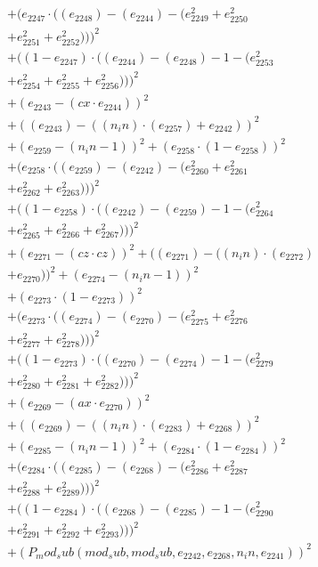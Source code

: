 \documentclass[10pt, a4paper]{article}
\begin{document}
\begin{align*}
& + (e_{2247}  \cdot  ((e_{2248}) - (e_{2244}) - (e_{2249}^{2} + e_{2250}^{2} \\
& + e_{2251}^{2} + e_{2252}^{2})))^{2} \\
& + ((1 - e_{2247})  \cdot  ((e_{2244}) - (e_{2248}) - 1 - (e_{2253}^{2} \\
& + e_{2254}^{2} + e_{2255}^{2} + e_{2256}^{2})))^{2} \\
& + (e_{2243} - (cx  \cdot  e_{2244}))^{2} \\
& + ((e_{2243}) - ((n_in)  \cdot  (e_{2257}) + e_{2242}))^{2} \\
& + (e_{2259} - (n_in - 1))^{2} + (e_{2258}  \cdot  (1 - e_{2258}))^{2} \\
& + (e_{2258}  \cdot  ((e_{2259}) - (e_{2242}) - (e_{2260}^{2} + e_{2261}^{2} \\
& + e_{2262}^{2} + e_{2263}^{2})))^{2} \\
& + ((1 - e_{2258})  \cdot  ((e_{2242}) - (e_{2259}) - 1 - (e_{2264}^{2} \\
& + e_{2265}^{2} + e_{2266}^{2} + e_{2267}^{2})))^{2} \\
& + (e_{2271} - (cz  \cdot  cz))^{2} + ((e_{2271}) - ((n_in)  \cdot  (e_{2272}) \\
& + e_{2270}))^{2} + (e_{2274} - (n_in - 1))^{2} \\
& + (e_{2273}  \cdot  (1 - e_{2273}))^{2} \\
& + (e_{2273}  \cdot  ((e_{2274}) - (e_{2270}) - (e_{2275}^{2} + e_{2276}^{2} \\
& + e_{2277}^{2} + e_{2278}^{2})))^{2} \\
& + ((1 - e_{2273})  \cdot  ((e_{2270}) - (e_{2274}) - 1 - (e_{2279}^{2} \\
& + e_{2280}^{2} + e_{2281}^{2} + e_{2282}^{2})))^{2} \\
& + (e_{2269} - (ax  \cdot  e_{2270}))^{2} \\
& + ((e_{2269}) - ((n_in)  \cdot  (e_{2283}) + e_{2268}))^{2} \\
& + (e_{2285} - (n_in - 1))^{2} + (e_{2284}  \cdot  (1 - e_{2284}))^{2} \\
& + (e_{2284}  \cdot  ((e_{2285}) - (e_{2268}) - (e_{2286}^{2} + e_{2287}^{2} \\
& + e_{2288}^{2} + e_{2289}^{2})))^{2} \\
& + ((1 - e_{2284})  \cdot  ((e_{2268}) - (e_{2285}) - 1 - (e_{2290}^{2} \\
& + e_{2291}^{2} + e_{2292}^{2} + e_{2293}^{2})))^{2} \\
& + (P_mod_sub(mod_sub, mod_sub, e_{2242}, e_{2268}, n_in, e_{2241}))^{2} \\

\end{align*}
\end{document}
